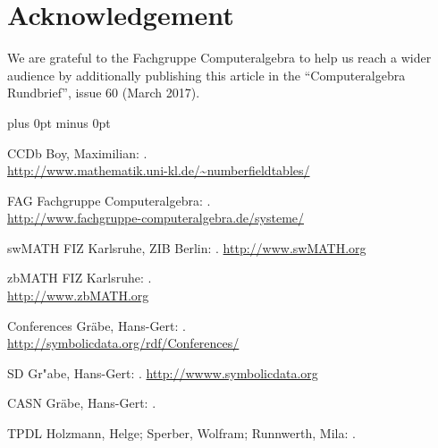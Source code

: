 \documentclass[12pt]{article}
\begin{document}
\section*{Acknowledgement}
We are grateful to the Fachgruppe Computeralgebra to help us reach a wider
audience by additionally publishing this article in the ``Computeralgebra
Rundbrief'', issue 60 (March 2017).


\begin{thebibliography}{19}
\itemsep=0cm plus 0pt minus 0pt

\bibitem
{CCDb}
Boy, Maximilian:
.\\
\newblock \url{http://www.mathematik.uni-kl.de/~numberfieldtables/}

\bibitem
{FAG}
Fachgruppe Computeralgebra:
.\\
\newblock \url{http://www.fachgruppe-computeralgebra.de/systeme/}

\bibitem
{swMATH}
FIZ Karlsruhe, ZIB Berlin:
.
\newblock \url{http://www.swMATH.org}

\bibitem
{zbMATH}
FIZ Karlsruhe:
.\\
\newblock \url{http://www.zbMATH.org}

\bibitem
{Conferences}
Gr\"abe, Hans-Gert:
.\\
\newblock \url{http://symbolicdata.org/rdf/Conferences/}


\bibitem
{SD}
Gr"abe, Hans-Gert:
.
\newblock \url{http://wwww.symbolicdata.org}

\bibitem
{CASN}
Gr\"abe, Hans-Gert:
.

\bibitem
{TPDL}
Holzmann, Helge; Sperber, Wolfram; Runnwerth, Mila:
.


\end{thebibliography}
\end{document}
